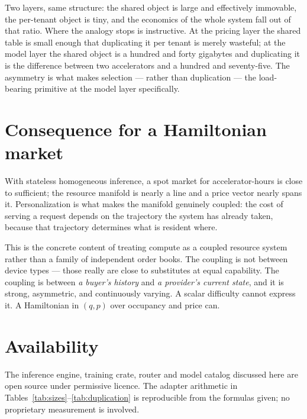 \documentclass[11pt,a4paper]{article}
\begin{document}
Two layers, same structure: the shared object is large and effectively immovable,
the per-tenant object is tiny, and the economics of the whole system fall out of
that ratio. Where the analogy stops is instructive. At the pricing layer the
shared table is small enough that duplicating it per tenant is merely wasteful; at
the model layer the shared object is a hundred and forty gigabytes and duplicating
it is the difference between two accelerators and a hundred and seventy-five. The
asymmetry is what makes selection --- rather than duplication --- the load-bearing
primitive at the model layer specifically.

\section{Consequence for a Hamiltonian market}

With stateless homogeneous inference, a spot market for accelerator-hours is
close to sufficient; the resource manifold is nearly a line and a price vector
nearly spans it. Personalization is what makes the manifold genuinely coupled:
the cost of serving a request depends on the trajectory the system has already
taken, because that trajectory determines what is resident where.

This is the concrete content of treating compute as a coupled resource system
rather than a family of independent order books. The coupling is not between
device types --- those really are close to substitutes at equal capability. The
coupling is between \emph{a buyer's history} and \emph{a provider's current
state}, and it is strong, asymmetric, and continuously varying. A scalar
difficulty cannot express it. A Hamiltonian in $(q,p)$ over occupancy and price
can.

\section*{Availability}

The inference engine, training crate, router and model catalog discussed here
are open source under permissive licence. The adapter arithmetic in
Tables~\ref{tab:sizes}--\ref{tab:duplication} is reproducible from the formulas
given; no proprietary measurement is involved.
\end{document}
